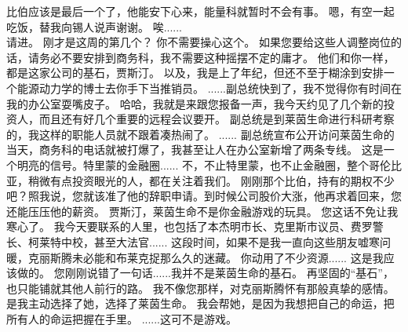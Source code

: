 \documentclass[openany]{book}
\begin{document}
\begin{dialogue}
     比伯应该是最后一个了，他能安下心来，能量科就暂时不会有事。
     嗯，有空一起吃饭，替我向锡人说声谢谢。
     唉......
    \\
     请进。
     刚才是这周的第几个？
     你不需要操心这个。
     如果您要给这些人调整岗位的话，请务必不要安排到商务科，我不需要这种摇摆不定的庸才。
     他们和你一样，都是这家公司的基石，贾斯汀。
     以及，我是上了年纪，但还不至于糊涂到安排一个能源动力学的博士去你手下当推销员。
     ......副总统快到了，我不觉得你有时间在我的办公室耍嘴皮子。
     哈哈，我就是来跟您报备一声，我今天约见了几个新的投资人，而且还有好几个重要的远程会议要开。
     副总统是到莱茵生命进行科研考察的，我这样的职能人员就不跟着凑热闹了。
     ......
     副总统宣布公开访问莱茵生命的当天，商务科的电话就被打爆了，我甚至让人在办公室新增了两条专线。
     这是一个明亮的信号。特里蒙的金融圈......
     不，不止特里蒙，也不止金融圈，整个哥伦比亚，稍微有点投资眼光的人，都在关注着我们。
     刚刚那个比伯，持有的期权不少吧？照我说，您就该准了他的辞职申请。到时候公司股价大涨，他再求着回来，您还能压压他的薪资。
     贾斯汀，莱茵生命不是你金融游戏的玩具。
     您这话不免让我寒心了。
     我今天要联系的人里，也包括了本杰明市长、克里斯市议员、费罗警长、柯莱特中校，甚至大法官......
     这段时间，如果不是我一直向这些朋友嘘寒问暖，克丽斯腾未必能和布莱克捉那么久的迷藏。
     你动用了不少资源......
     这是我应该做的。
     您刚刚说错了一句话......我并不是莱茵生命的基石。
     再坚固的“基石”，也只能铺就其他人前行的路。
     我不像您那样，对克丽斯腾怀有那般真挚的感情。是我主动选择了她，选择了莱茵生命。
     我会帮她，是因为我想把自己的命运，把所有人的命运把握在手里。
     ......这可不是游戏。
\end{dialogue}
\end{document}
